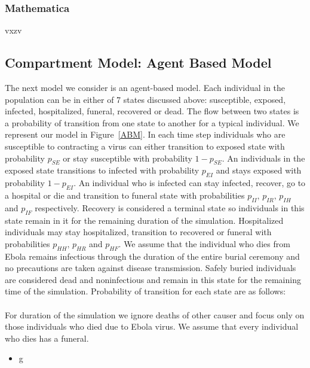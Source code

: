 \documentclass[10pt]{article}
\begin{document}
\subsubsection{Mathematica}
vxzv

\subsection{Compartment Model: Agent Based Model}
The next model we consider is an agent-based model. Each individual in the population can be in either of 7 states discussed above: susceptible, exposed, infected, hospitalized, funeral, recovered or dead. The flow between two states is a  probability of transition from one state to another for a typical individual. We represent our model in Figure~\ref{ABM}. In each time step individuals who are susceptible to contracting a virus can either transition to exposed state with probability $p_{SE}$ or stay susceptible with probability $1-p_{SE}$. An individuals in the exposed state transitions to infected with probability $p_{EI}$ and stays exposed with probability $1-p_{EI}$. An individual who is infected can stay infected, recover, go to a hospital or die and transition to funeral state with probabilities $p_{II},\, p_{IR},\, p_{IH}$ and $p_{IF}$ respectively. Recovery is considered a terminal state so individuals in this state remain in it for the remaining duration of the simulation. Hospitalized individuals may stay hospitalized, transition to recovered or funeral with probabilities $p_{HH}, \, p_{HR}$ and $p_{HF}$.   We assume that the individual who dies from Ebola remains infectious through the duration of the entire burial ceremony and no precautions are taken against disease transmission. Safely buried individuals are considered dead and noninfectious and remain in this state for the remaining time of the simulation.  Probability of transition for each state are as follows: \\\\
For duration of the simulation we ignore deaths of other causer and focus only on those individuals who died due to Ebola virus. We assume that every individual who dies has a funeral.
\begin{itemize}
 \item g
\end{itemize}
\end{document}

